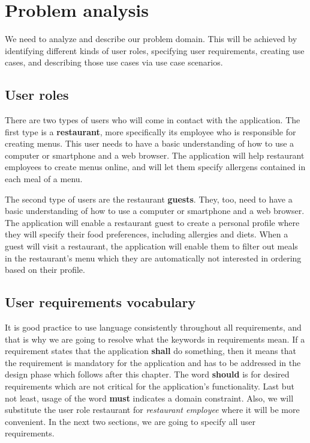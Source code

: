 \chapter{Problem analysis}
We need to analyze and describe our problem domain.
This will be achieved by identifying different kinds of user roles, specifying user requirements, creating use cases, and describing those use cases via use case scenarios.

\section{User roles}
There are two types of users who will come in contact with the application.
The first type is a \textbf{restaurant}, more specifically its employee who is responsible for creating menus.
This user needs to have a basic understanding of how to use a computer or smartphone and a web browser.
The application will help restaurant employees to create menus online, and will let them specify allergens contained in each meal of a menu.

The second type of users are the restaurant \textbf{guests}.
They, too, need to have a basic understanding of how to use a computer or smartphone and a web browser.
The application will enable a restaurant guest to create a personal profile where they will specify their food preferences, including allergies and diets.
When a guest will visit a restaurant, the application will enable them to filter out meals in the restaurant's menu which they are automatically not interested in ordering based on their profile.

\section{User requirements vocabulary}
It is good practice to use language consistently throughout all requirements, and that is why we are going to resolve what the keywords in requirements mean.
If a requirement states that the application \textbf{shall} do something, then it means that the requirement is mandatory for the application and has to be addressed in the design phase which follows after this chapter. 
The word \textbf{should} is for desired requirements which are not critical for the application's functionality.
Last but not least, usage of the word \textbf{must} indicates a domain constraint.
Also, we will substitute the user role restaurant for \emph{restaurant employee} where it will be more convenient.
In the next two sections, we are going to specify all user requirements. 

